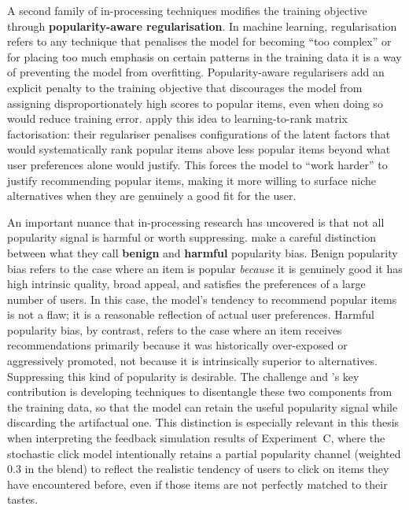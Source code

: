 \documentclass[11pt,a4paper]{report}
\begin{document}
A second family of in-processing techniques modifies the training objective through \textbf{popularity-aware regularisation}. In machine learning, regularisation refers to any technique that penalises the model for becoming ``too complex'' or for placing too much emphasis on certain patterns in the training data it is a way of preventing the model from overfitting. Popularity-aware regularisers add an explicit penalty to the training objective that discourages the model from assigning disproportionately high scores to popular items, even when doing so would reduce training error. \citet{abdollahpouri2017controlling} apply this idea to learning-to-rank matrix factorisation: their regulariser penalises configurations of the latent factors that would systematically rank popular items above less popular items beyond what user preferences alone would justify. This forces the model to ``work harder'' to justify recommending popular items, making it more willing to surface niche alternatives when they are genuinely a good fit for the user.

An important nuance that in-processing research has uncovered is that not all popularity signal is harmful or worth suppressing. \citet{zhao2022benignharmful} make a careful distinction between what they call \textbf{benign} and \textbf{harmful} popularity bias. Benign popularity bias refers to the case where an item is popular \emph{because} it is genuinely good it has high intrinsic quality, broad appeal, and satisfies the preferences of a large number of users. In this case, the model's tendency to recommend popular items is not a flaw; it is a reasonable reflection of actual user preferences. Harmful popularity bias, by contrast, refers to the case where an item receives recommendations primarily because it was historically over-exposed or aggressively promoted, not because it is intrinsically superior to alternatives. Suppressing this kind of popularity is desirable. The challenge and \citet{zhao2022benignharmful}'s key contribution is developing techniques to disentangle these two components from the training data, so that the model can retain the useful popularity signal while discarding the artifactual one. This distinction is especially relevant in this thesis when interpreting the feedback simulation results of Experiment~C, where the stochastic click model intentionally retains a partial popularity channel (weighted $0.3$ in the blend) to reflect the realistic tendency of users to click on items they have encountered before, even if those items are not perfectly matched to their tastes.
\end{document}

